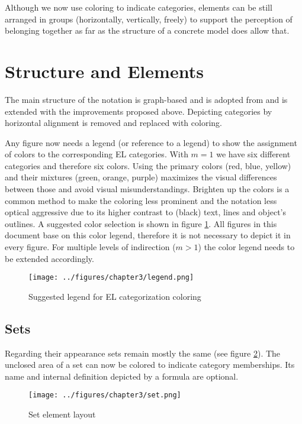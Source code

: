 \documentclass[twoside, openright, 12pt]{book}
\begin{document}
Although we now use coloring to indicate categories, elements can be still arranged in groups (horizontally, vertically, freely) to support the perception of belonging together as far as the structure of a concrete model does allow that.




\section{Structure and Elements}
\label{gsl_elements}
The main structure of the notation is graph-based and is adopted from \cite{Amthor18} and is extended with the improvements proposed above.
Depicting categories by horizontal alignment is removed and replaced with coloring.

Any figure now needs a legend (or reference to a legend) to show the assignment of colors to the corresponding EL categories.
With $m=1$ we have six different categories and therefore six colors.
Using the primary colors (red, blue, yellow) and their mixtures (green, orange, purple) maximizes the visual differences between those and avoid visual misunderstandings.
Brighten up the colors is a common method to make the coloring less prominent and the notation less optical aggressive due to its higher contrast to (black) text, lines and object's outlines.
A suggested color selection is shown in figure \ref{fig:legend}.
All figures in this document base on this color legend, therefore it is not necessary to depict it in every figure.
For multiple levels of indirection ($m>1$) the color legend needs to be extended accordingly.

\begin{figure}[htb]
	\centering
	\texttt{[image: ../figures/chapter3/legend.png]}
	\caption{Suggested legend for EL categorization coloring}
	\label{fig:legend}
\end{figure}

\subsection{Sets}
Regarding their appearance sets remain mostly the same (see figure \ref{fig:set}).
The unclosed area of a set can now be colored to indicate category memberships.
Its name and internal definition depicted by a formula are optional.

\begin{figure}[htb]
	\centering
	\texttt{[image: ../figures/chapter3/set.png]}
	\caption{Set element layout}
	\label{fig:set}
\end{figure}
\end{document}
